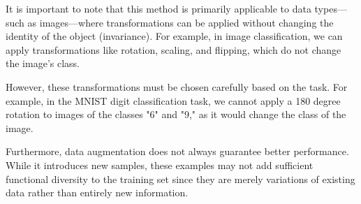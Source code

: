 It is important to note that this method is primarily applicable to data types—such as images—where transformations can 
be applied without changing the identity of the object (invariance). 
For example, in image classification, we can apply transformations like rotation, scaling, and flipping, which do not change the image's class.

However, these transformations must be chosen carefully based on the task. For example, in the MNIST digit classification task, we cannot apply a 180 degree rotation to 
images of the classes "6" and "9," as it would change the class of the image.

Furthermore, data augmentation does not always guarantee better performance. While it introduces new samples, 
these examples may not add sufficient functional diversity to the training set since they are 
merely variations of existing data rather than entirely new information.

